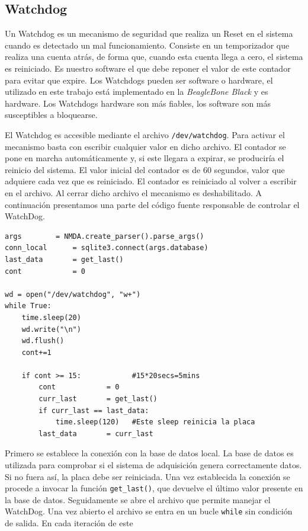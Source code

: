 	\subsection{Watchdog}
		Un Watchdog \cite{WatchDogWiki} es un mecanismo de seguridad que realiza un Reset en el sistema cuando es detectado un mal
		funcionamiento. Consiste en un temporizador que realiza una cuenta atrás, de forma que, cuando esta cuenta llega a cero, el sistema es
		reiniciado. Es nuestro software el que debe reponer el valor de este contador para evitar que expire. Los Watchdogs pueden ser
		software o hardware, el utilizado en este trabajo está implementado en la \emph{BeagleBone Black} y es hardware. Los Watchdogs hardware son
		más fiables, los software son más susceptibles a bloquearse.
		\par
		El Watchdog es accesible mediante el archivo \texttt{/dev/watchdog}. Para activar el mecanismo basta con escribir cualquier valor en
		dicho archivo. El contador se pone en marcha automáticamente y, si este llegara a expirar, se produciría el reinicio del sistema. El
		valor inicial del contador es de 60 segundos, valor que adquiere cada vez que es reiniciado. El contador es reiniciado al volver a
		escribir en el archivo. Al cerrar dicho archivo el mecanismo es deshabilitado. A continuación presentamos una parte del código fuente
		responsable de controlar el WatchDog.
		\begin{lstlisting}[style=myPython]
args		= NMDA.create_parser().parse_args()
conn_local      = sqlite3.connect(args.database)
last_data       = get_last()
cont            = 0

wd = open("/dev/watchdog", "w+")
while True:
    time.sleep(20)
    wd.write("\n")
    wd.flush()
    cont+=1

    if cont >= 15:            #15*20secs=5mins
        cont            = 0
        curr_last       = get_last()
        if curr_last == last_data:
            time.sleep(120)   #Este sleep reinicia la placa
        last_data       = curr_last
		\end{lstlisting}
		\par
		Primero se establece la conexión con la base de datos local. La base de datos es utilizada para comprobar si el sistema de adquisición
		genera correctamente datos. Si no fuera así, la placa debe ser reiniciada. Una vez establecida la conexión se procede a invocar la
		función \texttt{get\_last()}, que devuelve el último valor presente en la base de datos. Seguidamente se abre el archivo que permite
		manejar el WatchDog. Una vez abierto el archivo se entra en un bucle \texttt{while} sin condición de salida. En cada iteración de este
